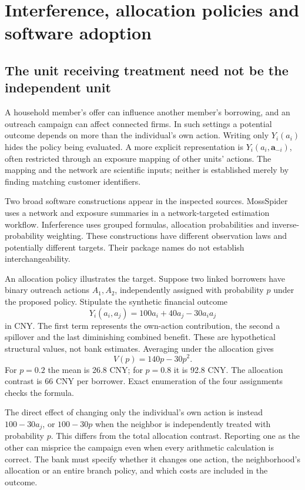 \chapter{Interference, allocation policies and software adoption}
\label{v13:sw-networks}

\section{The unit receiving treatment need not be the independent unit}

A household member's offer can influence another member's borrowing, and an
outreach campaign can affect connected firms. In such settings a potential
outcome depends on more than the individual's own action. Writing only
$Y_i(a_i)$ hides the policy being evaluated. A more explicit representation is
$Y_i(a_i,\mathbf a_{-i})$, often restricted through an exposure mapping of
other units' actions. The mapping and the network are scientific inputs;
neither is established merely by finding matching customer identifiers.

Two broad software constructions appear in the inspected sources. MossSpider
uses a network and exposure summaries in a network-targeted estimation
workflow. Inferference uses grouped formulas, allocation probabilities and
inverse-probability weighting. These constructions have different observation
laws and potentially different targets. Their package names do not establish
interchangeability.\cite{v13_sw_mossspider,v13_sw_inferference}

An allocation policy illustrates the target. Suppose two linked borrowers have
binary outreach actions $A_1,A_2$, independently assigned with probability $p$
under the proposed policy. Stipulate the synthetic financial outcome
\[
 Y_i(a_i,a_j)=100a_i+40a_j-30a_i a_j
\]
in CNY. The first term represents the own-action contribution, the second a
spillover and the last diminishing combined benefit. These are hypothetical
structural values, not bank estimates. Averaging under the allocation gives
\[
 V(p)=140p-30p^2.
\]
For $p=0.2$ the mean is 26.8 CNY; for $p=0.8$ it is 92.8 CNY. The allocation
contrast is 66 CNY per borrower. Exact enumeration of the four assignments
checks the formula.\cite{v13_project_exact}

The direct effect of changing only the individual's own action is instead
$100-30a_j$, or $100-30p$ when the neighbor is independently treated with
probability $p$. This differs from the total allocation contrast. Reporting
one as the other can misprice the campaign even when every arithmetic
calculation is correct. The bank must specify whether it changes one action,
the neighborhood's allocation or an entire branch policy, and which costs
are included in the outcome.

